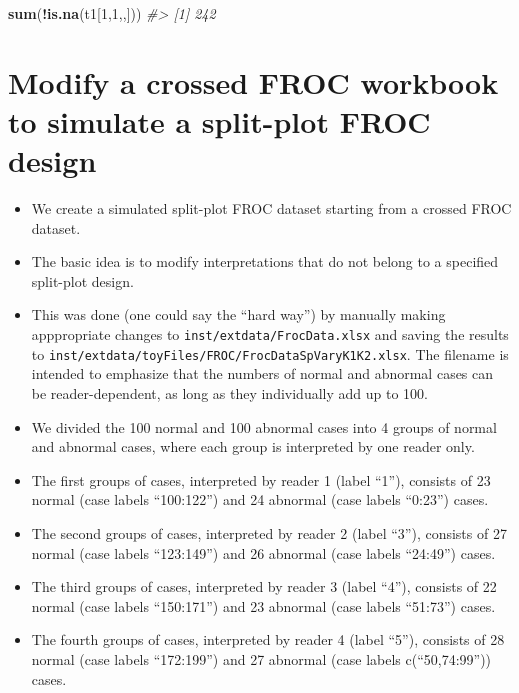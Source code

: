 \documentclass[]{book}
\newenvironment{Shaded}{\begin{snugshade}}{\end{snugshade}}
\newcommand{\CommentTok}[1]{\textcolor[rgb]{0.56,0.35,0.01}{\textit{#1}}}
\newcommand{\DecValTok}[1]{\textcolor[rgb]{0.00,0.00,0.81}{#1}}
\newcommand{\KeywordTok}[1]{\textcolor[rgb]{0.13,0.29,0.53}{\textbf{#1}}}
\newcommand{\NormalTok}[1]{#1}
\newcommand{\OperatorTok}[1]{\textcolor[rgb]{0.81,0.36,0.00}{\textbf{#1}}}
\providecommand{\tightlist}{%
  \setlength{\itemsep}{0pt}\setlength{\parskip}{0pt}}
\begin{document}
\begin{Shaded}
\begin{Highlighting}[]
\KeywordTok{sum}\NormalTok{(}\OperatorTok{!}\KeywordTok{is.na}\NormalTok{(t1[}\DecValTok{1}\NormalTok{,}\DecValTok{1}\NormalTok{,,]))}
\CommentTok{#> [1] 242}
\end{Highlighting}
\end{Shaded}

\hypertarget{modify-a-crossed-froc-workbook-to-simulate-a-split-plot-froc-design}{%
\section{Modify a crossed FROC workbook to simulate a split-plot FROC design}\label{modify-a-crossed-froc-workbook-to-simulate-a-split-plot-froc-design}}

\begin{itemize}
\tightlist
\item
  We create a simulated split-plot FROC dataset starting from a crossed FROC dataset.
\item
  The basic idea is to modify interpretations that do not belong to a specified split-plot design.
\item
  This was done (one could say the ``hard way'') by manually making apppropriate changes to \texttt{inst/extdata/FrocData.xlsx} and saving the results to \texttt{inst/extdata/toyFiles/FROC/FrocDataSpVaryK1K2.xlsx}. The filename is intended to emphasize that the numbers of normal and abnormal cases can be reader-dependent, as long as they individually add up to 100.
\item
  We divided the 100 normal and 100 abnormal cases into 4 groups of normal and abnormal cases, where each group is interpreted by one reader only.
\item
  The first groups of cases, interpreted by reader 1 (label ``1''), consists of 23 normal (case labels ``100:122'') and 24 abnormal (case labels ``0:23'') cases.
\item
  The second groups of cases, interpreted by reader 2 (label ``3''), consists of 27 normal (case labels ``123:149'') and 26 abnormal (case labels ``24:49'') cases.
\item
  The third groups of cases, interpreted by reader 3 (label ``4''), consists of 22 normal (case labels ``150:171'') and 23 abnormal (case labels ``51:73'') cases.
\item
  The fourth groups of cases, interpreted by reader 4 (label ``5''), consists of 28 normal (case labels ``172:199'') and 27 abnormal (case labels c(``50,74:99'')) cases.
\end{itemize}
\end{document}
